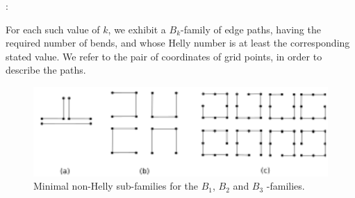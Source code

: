 \proof:

For each such value of $k$, we exhibit a $B_k$-family of edge paths, having the required number of bends, and whose Helly number is at least the corresponding stated value. We refer to the pair of coordinates of grid points, in order to describe the paths.

\begin{figure}[!h]
\begin{center}
\includegraphics[width=12cm]{./img/b1epgSub.pdf}
\end{center}
\caption{Minimal non-Helly sub-families for the $B_1$, $B_2$ and $B_3$ -families.}
\end{figure}

